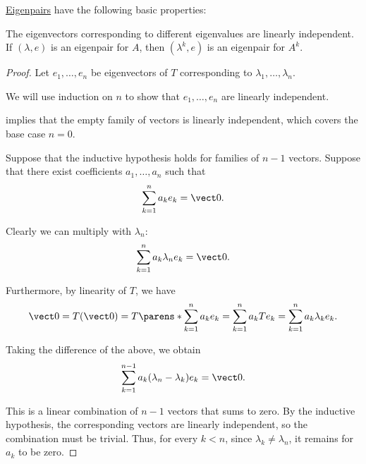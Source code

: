 \begin{proposition}\label{thm:def:eigenpair}
  \hyperref[def:eigenpair]{Eigenpairs} have the following basic properties:
  \begin{thmenum}
     The eigenvectors corresponding to different eigenvalues are linearly independent.
     If \( (\lambda, e) \) is an eigenpair for \( A \), then \( (\lambda^k, e) \) is an eigenpair for \( A^k \).
  \end{thmenum}
\end{proposition}
\begin{proof}
   Let \( e_1, \ldots, e_n \) be eigenvectors of \( T \) corresponding to \( \lambda_1, \ldots, \lambda_n \).

  We will use induction on \( n \) to show that \( e_1, \ldots, e_n \) are linearly independent.

   implies that the empty family of vectors is linearly independent, which covers the base case \( n = 0 \).

  Suppose that the inductive hypothesis holds for families of \( n - 1 \) vectors. Suppose that there exist coefficients \( a_1, \ldots, a_n \) such that
  \begin{equation*}
    \sum_{k=1}^n a_k e_k = \vect 0.
  \end{equation*}

  Clearly we can multiply with \( \lambda_n \):
  \begin{equation*}
    \sum_{k=1}^n a_k \lambda_n e_k = \vect 0.
  \end{equation*}

  Furthermore, by linearity of \( T \), we have
  \begin{equation*}
    \vect 0
    =
    T(\vect 0)
    =
    T\parens*{ \sum_{k=1}^n a_k e_k }
    =
    \sum_{k=1}^n a_k T e_k
    =
    \sum_{k=1}^n a_k \lambda_k e_k.
  \end{equation*}

  Taking the difference of the above, we obtain
  \begin{equation*}
    \sum_{k=1}^{n-1} a_k (\lambda_n - \lambda_k) e_k = \vect 0.
  \end{equation*}

  This is a linear combination of \( n - 1 \) vectors that sums to zero. By the inductive hypothesis, the corresponding vectors are linearly independent, so the combination must be trivial. Thus, for every \( k < n \), since \( \lambda_k \neq \lambda_n \), it remains for \( a_k \) to be zero.


\end{proof}
